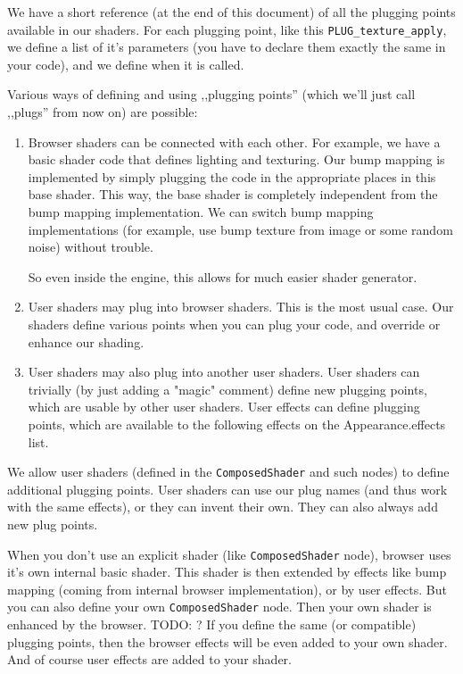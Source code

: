 \documentclass{acmsiggraph}                     %
\newenvironment{myenumerate}
{\begin{enumerate}
  \setlength{\itemsep}{0pt}
  \setlength{\parskip}{0pt}
  \setlength{\parsep}{0pt}}
{\end{enumerate}}
\begin{document}
We have a short reference (at the end of this document) of all
the plugging points available in our shaders. For each plugging point,
like this \texttt{PLUG\_texture\_apply}, we define a list of it's parameters
(you have to declare them exactly the same in your code), and we define
when it is called.

Various ways of defining and using ,,plugging points'' (which we'll just call
,,plugs'' from now on) are possible:

\begin{myenumerate}
\itemsep 0pt
\item Browser shaders can be connected with each other. For example, we
have a basic shader code that defines lighting and texturing. Our bump
mapping is implemented by simply plugging the code in the appropriate
places in this base shader. This way, the base shader is completely
independent from the bump mapping implementation. We can switch bump
mapping implementations (for example, use bump texture from image or
some random noise) without trouble.

So even inside the engine, this allows for much easier shader generator.

\item User shaders may plug into browser shaders. This is the most usual
case. Our shaders define various points when you can plug your code,
and override or enhance our shading.

\item User shaders may also plug into another user shaders. User shaders
can trivially (by just adding a "magic" comment) define new plugging
points, which are usable by other user shaders. User effects can
define plugging points, which are available to the following effects
on the Appearance.effects list.

\end{myenumerate}

We allow user shaders (defined in the \texttt{ComposedShader} and such nodes) to
define additional plugging points. User shaders can use our plug names
(and thus work with the same effects), or they can invent their
own. They can also always add new plug points.

When you don't use an explicit shader (like \texttt{ComposedShader} node),
browser uses it's own internal basic shader. This shader is then
extended by effects like bump mapping (coming from internal browser
implementation), or by user effects. But you can also define your own
\texttt{ComposedShader} node. Then your own shader is enhanced by the
browser. TODO: ? If you define the same (or compatible) plugging
points, then the browser effects will be even added to your own
shader. And of course user effects are added to your shader.
\end{document}
